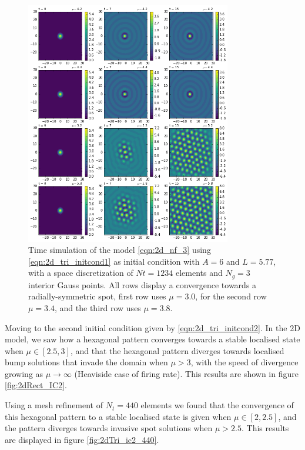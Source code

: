 \documentclass{uonmathreport}
\begin{document}
\begin{figure}[H]
	\begin{center}
		\includegraphics[width=0.8\textwidth]{Figures/2dTri_IC1_1234elems.png}
	\end{center}
	\caption{Time simulation of the model \ref{eqn:2d_nf_3} using \ref{eqn:2d_tri_initcond1} as initial condition with $A=6$ and $L=5.77$, with a space discretization of $Nt=1234$ elements and $N_g=3$ interior Gauss points. All rows display a convergence towards a radially-symmetric spot, first row uses $\mu=3.0$, for the second row $\mu=3.4$, and the third row uses $\mu=3.8$.}
	\label{fig:2dTri_ic1_1234}
\end{figure}

Moving to the second initial condition given by \ref{eqn:2d_tri_initcond2}. In the 2D model, we saw how a hexagonal pattern converges towards a stable localised state when $\mu \in [2.5, 3]$, and that the hexagonal pattern diverges towards localised bump solutions that invade the domain when $\mu > 3$, with the speed of divergence growing as $\mu \rightarrow \infty$ (Heaviside case of firing rate). This results are shown in figure \ref{fig:2dRect_IC2}.

Using a mesh refinement of $N_t = 440$ elements we found that the convergence of this hexagonal pattern to a stable localised state is given when $\mu \in [2, 2.5]$, and the pattern diverges towards invasive spot solutions when $\mu > 2.5$. This results are displayed in figure \ref{fig:2dTri_ic2_440}. 
\end{document}
